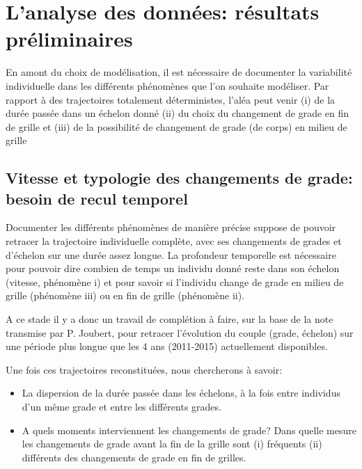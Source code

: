 \documentclass[11pt,a4paper]{article}
\begin{document}
\else \fi



\section{L'analyse des données: résultats préliminaires}

En amont du choix de modélisation, il est nécessaire de documenter la variabilité individuelle dans les différents phénomènes que l'on souhaite modéliser. Par rapport à des trajectoires totalement déterministes, l'aléa peut venir (i) de la durée passée dans un échelon donné (ii) du choix du changement de grade en fin de grille et (iii) de la possibilité de changement de grade (de corps) en milieu de grille 

\subsection{Vitesse et typologie des changements de grade: besoin de recul temporel}

Documenter les différents phénomènes de manière précise suppose de pouvoir retracer la trajectoire individuelle complète, avec ses changements de grades et d'échelon sur une durée assez longue. La profondeur temporelle est nécessaire pour pouvoir dire combien de temps un individu donné reste dans son échelon (vitesse, phénomène i) et pour savoir si l'individu change de grade en milieu de grille (phénomène iii) ou en fin de grille (phénomène ii). 

A ce stade il y a donc un travail de complétion à faire, sur la base de la note transmise par P. Joubert, pour retracer l'évolution du couple (grade, échelon) sur une période plus longue que les 4 ans (2011-2015) actuellement disponibles. 

Une fois ces trajectoires reconstituées, nous chercherons à savoir: 
\begin{itemize}[leftmargin=1cm ,parsep=0cm,itemsep=0cm,topsep=0cm] 
\item La dispersion de la durée passée dans les échelons, à la fois entre individus d'un même grade et entre les différents grades. 
\item A quels moments interviennent les changements de grade? Dans quelle mesure les changements de grade avant la fin de la grille sont (i) fréquents (ii) différents des changements de grade en fin de grilles. 
\end{itemize}
\end{document}
